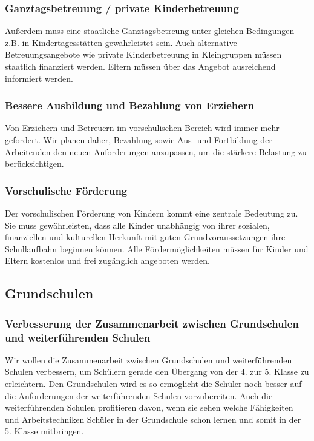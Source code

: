 \subsubsection{Ganztagsbetreuung / private Kinderbetreuung}
\abstimmung
Außerdem muss eine staatliche Ganztagsbetreung unter gleichen Bedingungen z.B. in Kindertagesstätten gewährleistet sein. Auch alternative Betreuungsangebote wie private Kinderbetreuung in Kleingruppen müssen staatlich finanziert werden. Eltern müssen über das Angebot ausreichend informiert werden.
 

\subsubsection{Bessere Ausbildung und Bezahlung von Erziehern}
\abstimmung
Von Erziehern und Betreuern im vorschulischen Bereich wird immer mehr gefordert. Wir planen daher, Bezahlung sowie Aus- und Fortbildung der Arbeitenden den neuen Anforderungen anzupassen, um die stärkere Belastung zu berücksichtigen.
 

\subsubsection{Vorschulische Förderung}
\abstimmung
Der vorschulischen Förderung von Kindern kommt eine zentrale Bedeutung zu. Sie muss gewährleisten, dass alle Kinder unabhängig von ihrer sozialen, finanziellen und kulturellen Herkunft mit guten Grundvoraussetzungen ihre Schullaufbahn beginnen können. Alle Fördermöglichkeiten müssen für Kinder und Eltern kostenlos und frei zugänglich angeboten werden.
 
\subsection*{Grundschulen}

\subsubsection{Verbesserung der Zusammenarbeit zwischen Grundschulen und weiterführenden Schulen}
\abstimmung
Wir wollen die Zusammenarbeit zwischen Grundschulen und weiterführenden Schulen verbessern, um Schülern gerade den Übergang von der 4. zur 5. Klasse zu erleichtern. Den Grundschulen wird es so ermöglicht die Schüler noch besser auf die Anforderungen der weiterführenden Schulen vorzubereiten. Auch die weiterführenden Schulen profitieren davon, wenn sie sehen welche Fähigkeiten und Arbeitstechniken Schüler in der Grundschule schon lernen und somit in der 5. Klasse mitbringen.
 
